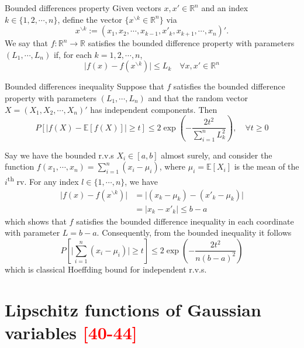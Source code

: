 \documentclass[10pt,handout,english]{beamer}
\newcommand{\ts}{\textsuperscript}
\newcommand{\E}{\mathbb{E}}
\newcommand{\R}{\mathbb{R}}
\newcommand{\1}{\mathbbm{1}}
\begin{document}
\begin{frame}
\begin{block}{Bounded differences property}
Given vectors $x,x'\in\R^n$ and an index $k\in\{1,2,\cdots,n\}$, define the vector $\{x^{\backslash k}\in\R^n\}$ via
\[
x^{\backslash k}:=(x_1,x_2,\cdots,x_{k-1},x'_k,x_{k+1},\cdots,x_n)'.
\]
We say that $f:\R^n\to\R$ satisfies the bounded difference property with parameters $(L_1,\cdots,L_n)$ if, for each $k=1,2,\cdots,n$,
\[
\lvert f(x)-f(x^{\backslash k})\rvert\leq L_k\quad \forall x,x'\in\R^n
\]
\end{block}
\end{frame}
\begin{frame}
\begin{block}{Bounded differences inequality}
Suppose that $f$ satisfies the bounded difference property with parameters $(L_1,\cdots,L_n)$ and that the random vector $X=(X_1,X_2,\cdots,X_n)'$ has independent components. Then
\[
P[\lvert f(X)-\E[f(X)]\rvert\geq t]\leq 2\exp\left(-\frac{2t^2}{\sum_{i=1}^{n}L_k^2}\right),\quad \forall t\geq 0
\]
\end{block}
\end{frame}
\begin{frame}
\begin{example}
Say we have the bounded r.v.s $X_i\in[a,b]$ almost surely, and consider the function $f(x_1,\cdots,x_n)=\sum_{i=1}^n(x_i-\mu_i)$, where $\mu_i=\E[X_i]$ is the mean of the $i$\ts{th} rv. For any index $l\in\{1,\cdots,n\}$, we have
\begin{align*}
\lvert f(x)-f(x^{\backslash k})\rvert&=\lvert (x_k-\mu_k)-(x'_k-\mu_k)\rvert\\
&=\lvert x_k-x'_k\rvert\leq b-a 
\end{align*}
which shows that $f$ satisfies the bounded difference inequality in each coordinate with parameter $L=b-a$. Consequently, from the bounded inequality it follows
\[
P\left[\lvert\sum\limits_{i=1}^{n}(x_i-\mu_i)\rvert\geq t\right]\leq 2\exp\left(-\frac{2t^2}{n(b-a)^2}\right)
\]
which is classical Hoeffding bound for independent r.v.s.
\end{example}
\end{frame}
\section{Lipschitz functions of Gaussian variables \textcolor{red}{[40-44]}}
\frame{\tableofcontents[currentsection]}
\end{document}
